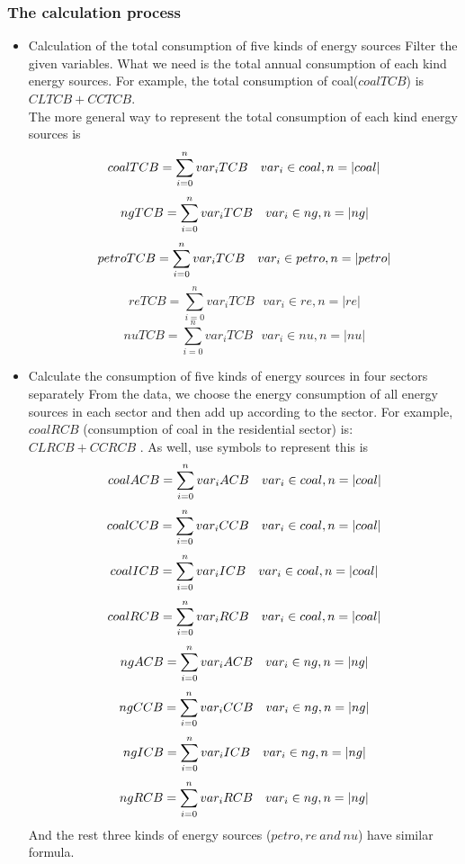 \documentclass{mcmthesis}
\begin{document}
\subsubsection{The calculation process}
\begin{itemize}
  \item Calculation of the total consumption of five kinds of energy sources
  Filter the given variables. What we need is the total annual consumption of each kind energy sources.
  For example, the total consumption of coal($coalTCB$) is $CLTCB + CCTCB$. \\
  The more general way to represent the total consumption of each kind energy sources is\\
  $$coalTCB = \sum_{i=0}^{n} var_iTCB  \ \ \ var_i \in coal, n = |coal| \\$$
  $$ngTCB = \sum_{i=0}^{n} var_iTCB  \ \ \ var_i \in ng, n = |ng| \\$$
  $$petroTCB = \sum_{i=0}^{n} var_iTCB  \ \ \ var_i \in petro, n = |petro| \\$$
  $$reTCB = \sum_{i=0}^{n} var_iTCB  \ \ \ var_i \in re, n = |re|$$
  $$nuTCB = \sum_{i=0}^{n} var_iTCB  \ \ \ var_i \in nu, n = |nu|$$
  \item Calculate the consumption of five kinds of energy sources in four sectors separately
  From the data, we choose the energy consumption of all energy sources in each sector and then add up according to the sector.
  For example, $coalRCB$ (consumption of coal in the residential sector) is: $CLRCB + CCRCB$ .
  As well, use symbols to represent this is
  $$coalACB = \sum_{i=0}^{n} var_iACB  \ \ \ var_i \in coal, n = |coal| \\$$
  $$coalCCB = \sum_{i=0}^{n} var_iCCB  \ \ \ var_i \in coal, n = |coal| \\$$
  $$coalICB = \sum_{i=0}^{n} var_iICB  \ \ \ var_i \in coal, n = |coal| \\$$
  $$coalRCB = \sum_{i=0}^{n} var_iRCB  \ \ \ var_i \in coal, n = |coal| \\$$
  $$ngACB = \sum_{i=0}^{n} var_iACB  \ \ \ var_i \in ng, n = |ng| \\$$
  $$ngCCB = \sum_{i=0}^{n} var_iCCB  \ \ \ var_i \in ng, n = |ng| \\$$
  $$ngICB = \sum_{i=0}^{n} var_iICB  \ \ \ var_i \in ng, n = |ng| \\$$
  $$ngRCB = \sum_{i=0}^{n} var_iRCB  \ \ \ var_i \in ng, n = |ng| \\$$
  And the rest three kinds of energy sources ($petro, re\ and\ nu$) have similar formula.
\end{itemize}
\end{document}
